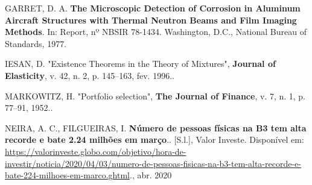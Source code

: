\documentclass[grad,numbers]{coppe}
\begin{document}
  \hypertarget{refs}{}
  \leavevmode\hypertarget{ref-techreport-exampleIn}{}%
  GARRET, D. A. \textbf{The Microscopic Detection of Corrosion in Aluminum Aircraft Structures with Thermal Neutron Beams and Film Imaging Methods}. In: Report, nº NBSIR 78-1434. Washington, D.C., National Bureau of Standards, 1977.
  
  \leavevmode\hypertarget{ref-article-example}{}%
  IESAN, D. "Existence Theorems in the Theory of Mixtures", \textbf{Journal of Elasticity}, v. 42, n. 2, p. 145--163, fev. 1996..
  
  \leavevmode\hypertarget{ref-markowitz1952}{}%
  MARKOWITZ, H. "Portfolio selection", \textbf{The Journal of Finance}, v. 7, n. 1, p. 77--91, 1952..
  
  \leavevmode\hypertarget{ref-valorinveste2020}{}%
  NEIRA, A. C., FILGUEIRAS, I. \textbf{Número de pessoas físicas na B3 tem alta recorde e bate 2.24 milhões em março}.. {[}S.l.{]}, Valor Investe. Disponível em: \url{https://valorinveste.globo.com/objetivo/hora-de-investir/noticia/2020/04/03/numero-de-pessoas-fisicas-na-b3-tem-alta-recorde-e-bate-224-milhoes-em-marco.ghtml}., abr. 2020

  \backmatter
  
  

\end{document}
